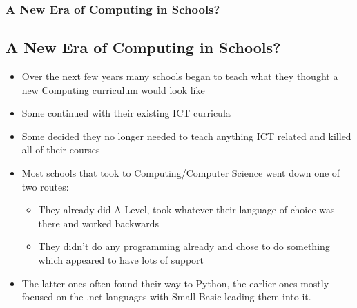 \documentclass{beamer}
\begin{document}
\begin{frame}
  \frametitle{A New Era of Computing in Schools?}
  \subsection{A New Era of Computing in Schools?}
  \begin{itemize}
    \pause
  \item Over the next few years many schools began to teach what they thought a new Computing curriculum would look
    like
    \pause
  \item Some continued with their existing ICT curricula
    \pause
  \item Some decided they no longer needed to teach anything ICT related and killed all of their courses
    \pause
  \item Most schools that took to Computing/Computer Science went down one of two routes:
    \pause
    \begin{itemize}
      \pause
    \item They already did A Level, took whatever their language of choice was there and worked backwards
      \pause
    \item They didn't do any programming already and chose to do something which appeared to have lots of support
    \end{itemize}
    \pause
  \item The latter ones often found their way to Python, the earlier ones mostly focused on the .net languages with
    Small Basic leading them into it.
  \end{itemize}
 
\end{frame}

  
\end{document}
